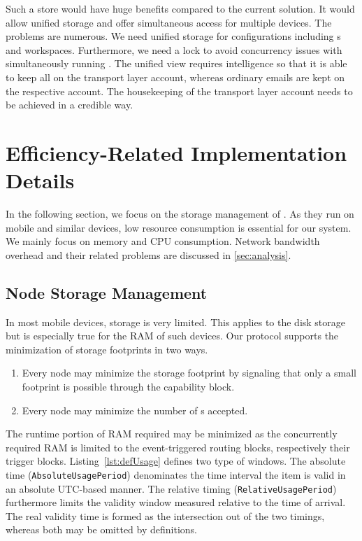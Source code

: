 Such a store would have huge benefits compared to the current solution. It would allow unified storage and offer simultaneous access for multiple devices. The problems are numerous. We need unified storage for configurations including s and workspaces. Furthermore, we need a lock to avoid concurrency issues with simultaneously running \VortexNodes{}. The unified view requires intelligence so that it is able to keep all \VortexMessages{} on the transport layer account, whereas ordinary emails are kept on the respective account. The housekeeping of the transport layer account needs to be achieved in a credible way. 

\chapter{Efficiency-Related Implementation Details}\label{sec:efficiencyImplementation}
In the following section, we focus on the storage management of \VortexNodes{}. As they run on mobile and similar devices, low resource consumption is essential for our system. We mainly focus on memory and CPU consumption. Network bandwidth overhead and their related problems are discussed in \cref{sec:analysis}.

\section{Node Storage Management}
In most mobile devices, storage is very limited. This applies to the disk storage but is especially true for the RAM of such devices. Our protocol supports the minimization of storage footprints in two ways.
\begin{enumerate}
	\item Every node may minimize the storage footprint by signaling that only a small footprint is possible through the capability block.
	\item Every node may minimize the number of s accepted.
\end{enumerate}

The runtime portion of RAM required may be minimized as the concurrently required RAM is limited to the event-triggered routing blocks, respectively their trigger blocks. Listing~\ref{lst:defUsage} defines two type of windows. The absolute time (\texttt{AbsoluteUsagePeriod}) denominates the time interval the item is valid in an absolute UTC-based manner. The relative timing (\texttt{RelativeUsagePeriod}) furthermore limits the validity window measured relative to the time of arrival. The real validity time is formed as the intersection out of the two timings, whereas both may be omitted by definitions.

